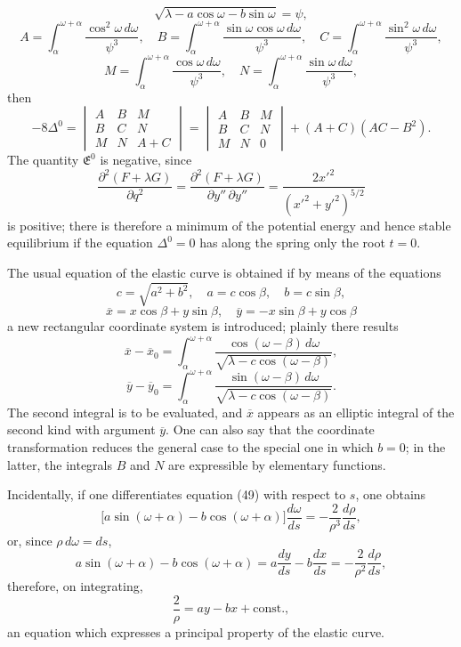 \documentclass[11pt,a4paper,leqno]{article}
\begin{document}
\[
\sqrt{\lambda-a\cos\omega-b\sin\omega}=\psi,
\]
\[
A=\int_\alpha^{\omega+\alpha}\frac{\cos^2\omega\,d\omega}{\psi^3},\quad
B=\int_\alpha^{\omega+\alpha}\frac{\sin\omega\cos\omega\,d\omega}{\psi^3},\quad
C=\int_\alpha^{\omega+\alpha}\frac{\sin^2\omega\,d\omega}{\psi^3},
\]
\[
M=\int_\alpha^{\omega+\alpha}\frac{\cos\omega\,d\omega}{\psi^3},\quad
N=\int_\alpha^{\omega+\alpha}\frac{\sin\omega\,d\omega}{\psi^3},
\]
then
\[
-8\Delta^0=
\begin{vmatrix}
A&B&M\\
B&C&N\\
M&N&A+C
\end{vmatrix}
=
\begin{vmatrix}
A&B&M\\
B&C&N\\
M&N&0
\end{vmatrix}
+(A+C)(AC-B^2).
\]
The quantity $\mathfrak{E}^0$ is negative, since
\[
\frac{\partial^2(F+\lambda G)}{\partial q^2}
=\frac{\partial^2(F+\lambda G)}{\partial y''\,\partial y''}
=\frac{2x'^2}{(x'^2+y'^2)^{5/2}}
\]
is positive; there is therefore a minimum of the potential energy and hence stable equilibrium if the equation $\Delta^0=0$ has along the spring only the root $t=0$.

The usual equation of the elastic curve is obtained if by means of the equations
\[
c=\sqrt{a^2+b^2},\quad a=c\cos\beta,\quad b=c\sin\beta,
\]
\[
\overline{x}=x\cos\beta+y\sin\beta,\quad
\overline{y}=-x\sin\beta+y\cos\beta
\]
a new rectangular coordinate system is introduced; plainly there results
\[
\overline{x}-\overline{x}_0=
\int_\alpha^{\omega+\alpha}
\frac{\cos(\omega-\beta)\,d\omega}{\sqrt{\lambda-c\cos(\omega-\beta)}},
\]
\[
\overline{y}-\overline{y}_0=
\int_\alpha^{\omega+\alpha}
\frac{\sin(\omega-\beta)\,d\omega}{\sqrt{\lambda-c\cos(\omega-\beta)}}.
\]
The second integral is to be evaluated, and $\overline{x}$ appears as an elliptic integral of the second kind with argument $\overline{y}$. One can also say that the coordinate transformation reduces the general case to the special one in which $b=0$; in the latter, the integrals $B$ and $N$ are expressible by elementary functions.

Incidentally, if one differentiates equation (49) with respect to $s$, one obtains
\[
\bigl[a\sin(\omega+\alpha)-b\cos(\omega+\alpha)\bigr]\frac{d\omega}{ds}
=-\frac2{\rho^3}\frac{d\rho}{ds},
\]
or, since $\rho\,d\omega=ds$,
\[
a\sin(\omega+\alpha)-b\cos(\omega+\alpha)
=a\frac{dy}{ds}-b\frac{dx}{ds}
=-\frac2{\rho^2}\frac{d\rho}{ds},
\]
therefore, on integrating,
\[
\frac2{\rho}=ay-bx+\mathrm{const.},
\]
an equation which expresses a principal property of the elastic curve.
\end{document}
